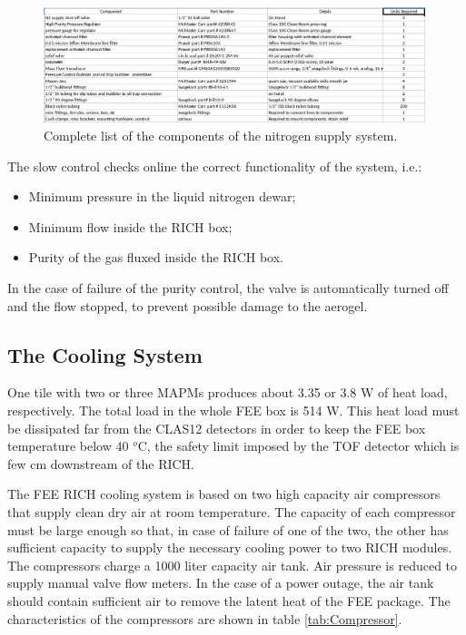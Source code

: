 \documentclass[12pt]{article}
\begin{document}
\begin{figure}[h!]
\center
\includegraphics[width=0.99\textwidth]{pics/N2_components.jpg}
\caption{ \label{fig:N2_components} Complete list of the components of the nitrogen supply system.}
\end{figure}



The slow control checks online the correct functionality of the system, i.e.:
\begin{itemize}
\item{Minimum pressure in the liquid nitrogen dewar;}
\item{Minimum flow inside the RICH box;}
\item{Purity of the gas fluxed inside the RICH box.}
\end{itemize}
In the case of failure of the purity control, the valve is automatically turned off and the flow stopped, to prevent possible damage to the aerogel.



\subsection{The Cooling System}

One tile with two or three MAPMs produces about 3.35 or 3.8 W of heat load, respectively.
The total load in the whole FEE box is 514 W.
This heat load must be dissipated far from the CLAS12 detectors in order to keep the FEE box temperature below 40 $^o$C, the safety limit imposed by the TOF detector which is few cm downstream of the RICH.

The FEE RICH cooling system is based on two high capacity air compressors that supply clean dry air at room temperature.
The capacity of each compressor must be large enough so that, in case of failure of one of the two, the other has sufficient capacity to supply the necessary cooling power to two RICH modules.
The compressors charge a 1000 liter capacity air tank.
Air pressure is reduced to supply manual valve flow meters.
In the case of a power outage, the air tank should contain sufficient air to remove the latent heat of the FEE package.
The characteristics of the compressors are shown in table \ref{tab:Compressor}.
\end{document}

